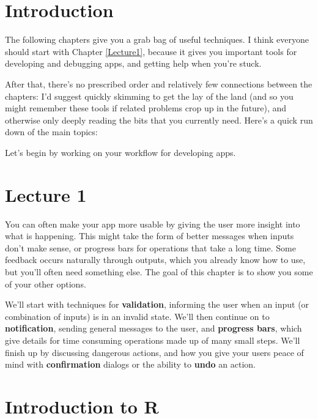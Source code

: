 \documentclass[
]{article}
\begin{document}
\hypertarget{week1-intro}{%
\section*{Introduction}\label{week1-intro}}

The following chapters give you a grab bag of useful techniques.
I think everyone should start with Chapter \ref{Lecture1}, because it gives you important tools for developing and debugging apps, and getting help when you're stuck.

After that, there's no prescribed order and relatively few connections between the chapters: I'd suggest quickly skimming to get the lay of the land (and so you might remember these tools if related problems crop up in the future), and otherwise only deeply reading the bits that you currently need.
Here's a quick run down of the main topics:

Let's begin by working on your workflow for developing apps.

\hypertarget{lecture1}{%
\section{Lecture 1}\label{lecture1}}

You can often make your app more usable by giving the user more insight into what is happening.
This might take the form of better messages when inputs don't make sense, or progress bars for operations that take a long time.
Some feedback occurs naturally through outputs, which you already know how to use, but you'll often need something else.
The goal of this chapter is to show you some of your other options.

We'll start with techniques for \textbf{validation}, informing the user when an input (or combination of inputs) is in an invalid state.
We'll then continue on to \textbf{notification}, sending general messages to the user, and \textbf{progress bars}, which give details for time consuming operations made up of many small steps.
We'll finish up by discussing dangerous actions, and how you give your users peace of mind with \textbf{confirmation} dialogs or the ability to \textbf{undo} an action.

\hypertarget{seminar1}{%
\section{Introduction to R}\label{seminar1}}
\end{document}

